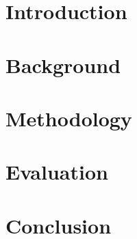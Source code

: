 \graphicspath{{figs/}}

\section{Introduction}


\section{Background}


\section{Methodology}


\begin{comment}
\begin{figure*}[ht]
    \centering
    \subfigure[Network scan: Throughput timeline.] {
        \texttt{[image: NetworkManagerScan/timeline\_no\_fix.pdf]}
        \label{fig:scan_issue}
    }\hfill
    \subfigure[802.11ac contention: Timeline showing throughput drop during contention.] {
        \texttt{[image: contention/timeline.pdf]}
        \label{fig:contention_timeline}
    }\hfill
    \subfigure[802.11ad blockage: 802.11ad throughput drop after re-connection.] {
        \texttt{[image: blockage/blockage\_tput\_drop.pdf]}
        \label{fig:blockage_tput_drop}
    }
    \vspace{-0.2in}
    \caption{Performance issues.}
    \vspace{-0.22in}
\end{figure*}
\end{comment}

\section{Evaluation}


\section{Conclusion}
